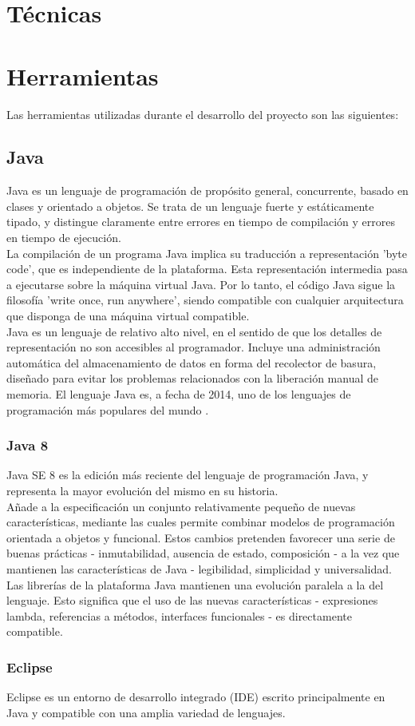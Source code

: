 
\section{Técnicas}

\section{Herramientas}

Las herramientas utilizadas durante el desarrollo del proyecto son las siguientes:

\subsection{Java}

Java es un lenguaje de programación de propósito general, concurrente, basado en clases y orientado a objetos.
Se trata de un lenguaje fuerte y estáticamente tipado, y distingue claramente entre errores en tiempo de compilación y errores en tiempo de ejecución.
\\
La compilación de un programa Java implica su traducción a representación 'byte code', que es independiente de la plataforma.
Esta representación intermedia pasa a ejecutarse sobre la máquina virtual Java.
Por lo tanto, el código Java sigue la filosofía 'write once, run anywhere', siendo compatible con cualquier arquitectura que disponga de una máquina virtual compatible.
\\
Java es un lenguaje de relativo alto nivel, en el sentido de que los detalles de representación no son accesibles al programador.
Incluye una administración automática del almacenamiento de datos en forma del recolector de basura, diseñado para evitar los problemas relacionados con la liberación manual de memoria.
\cite{jls8}
El lenguaje Java es, a fecha de 2014, uno de los lenguajes de programación más populares del mundo \cite{tiobe}.

\subsubsection{Java 8}

Java SE 8 es la edición más reciente del lenguaje de programación Java, y representa la mayor evolución del mismo en su historia.
\\
Añade a la especificación un conjunto relativamente pequeño de nuevas características, mediante las cuales permite combinar modelos de programación orientada a objetos y funcional.
Estos cambios pretenden favorecer una serie de buenas prácticas - inmutabilidad, ausencia de estado, composición - a la vez que mantienen las características de Java - legibilidad, simplicidad y universalidad.
\\
Las librerías de la plataforma Java mantienen una evolución paralela a la del lenguaje.
Esto significa que el uso de las nuevas características - expresiones lambda, referencias a métodos, interfaces funcionales - es directamente compatible.
\cite{jls8}

\subsubsection{Eclipse}

Eclipse es un entorno de desarrollo integrado (IDE) escrito principalmente en Java y compatible con una amplia variedad de lenguajes.


